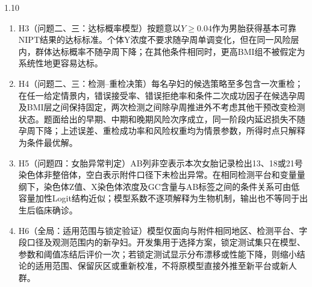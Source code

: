 \documentclass[12pt,a4paper]{ctexrep}
\numberwithin{equation}{section}
\begin{document}
\begin{spacing}{1.10}
{\begin{enumerate}[label={},leftmargin=0em,itemindent=0em,itemsep=4pt,topsep=2pt]
			\item {\heiti H3（问题二、三：达标概率模型）}\quad 按题意以$Y\geq0.04$作为男胎获得基本可靠NIPT结果的达标标准。个体Y浓度不要求随孕周单调变化，但在同一风险层内，群体达标概率不随孕周下降；在其他条件相同时，更高BMI组不被假定为系统性地更容易达标。

			\item {\heiti H4（问题二、三：检测--重检决策）}\quad 每名孕妇的候选策略至多包含一次重检；在任一给定情景内，错误接受率、错误拒绝率和条件二次成功因子在候选孕周及BMI层之间保持固定，两次检测之间除孕周推进外不考虑其他干预改变检测状态。题面给出的早期、中期和晚期风险次序成立，同一阶段内延迟损失不随孕周下降；上述误差、重检成功率和风险权重均为情景参数，所得时点只解释为条件最优解。

			\item {\heiti H5（问题四：女胎异常判定）}\quad AB列非空表示本次女胎记录检出13、18或21号染色体非整倍体，空白表示附件口径下未检出异常。在相同检测平台和变量量纲下，染色体Z值、X染色体浓度及GC含量与AB标签之间的条件关系可由低容量加性Logit结构近似；模型系数不逐项解释为生物机制，输出也不等同于出生后临床确诊。

			\item {\heiti H6（全局：适用范围与锁定验证）}\quad 模型仅面向与附件相同地区、检测平台、字段口径及观测范围内的新孕妇。开发集用于选择方案，锁定测试集只在模型、参数和阈值冻结后评价一次；若锁定测试显示分布漂移或性能下降，则缩小结论的适用范围、保留灰区或重新校准，不将原模型直接外推至新平台或新人群。
			\end{enumerate}
			
}
\end{spacing}
\end{document}
